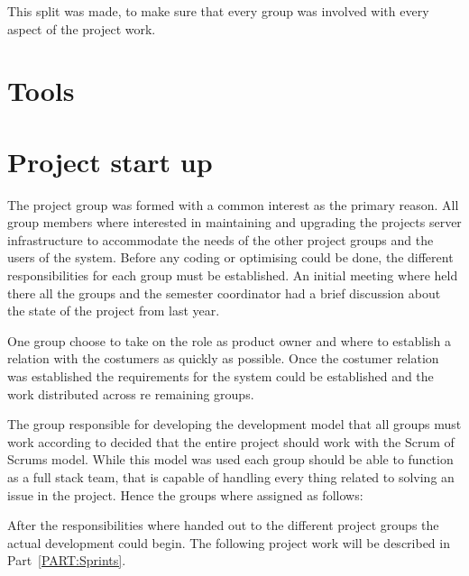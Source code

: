 This split was made, to make sure that every group was involved with every aspect of the project work.

\section{Tools}

\section{Project start up}
The project group was formed with a common interest as the primary reason. 
All group members where interested in maintaining and upgrading the projects server infrastructure to accommodate the needs of the other project groups and the users of the system. 
Before any coding or optimising could be done, the different responsibilities for each group must be established. 
An initial meeting where held there all the groups and the semester coordinator had a brief discussion about the state of the project from last year. 

One group choose to take on the role as product owner and where to establish a relation with the costumers as quickly as possible. 
Once the costumer relation was established the requirements for the system could be established and the work distributed across re remaining groups.

The group responsible for developing the development model that all groups must work according to decided that the entire project should work with the Scrum of Scrums model.
While this model was used each group should be able to function as a full stack team, that is capable of handling every thing related to solving an issue in the project.
Hence the groups where assigned as follows:

After the responsibilities where handed out to the different project groups the actual development could begin.
The following project work will be described in Part~\ref{PART:Sprints}.
